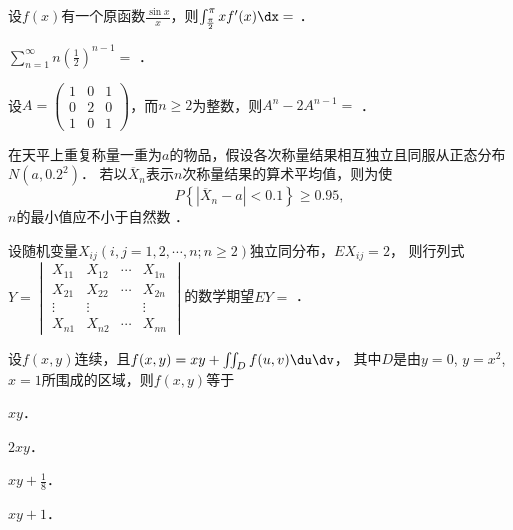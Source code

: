 \documentclass[plain,noanswer,medmath]{../../template/jnuexam}
\begin{document}






\begin{problem}
设$f(x)$有一个原函数$\frac{\sin x}{x}$，则$\int_{\frac{\pi}{2}}^{\pi}xf'(x)\dx =$ \fillin{}．
\end{problem}


\begin{problem}
$\sum_{n = 1}^{\infty}n\left(\frac{1}{2} \right)^{n - 1} =$ \fillin{}．
\end{problem}


\begin{problem}
设$A = \begin{pmatrix}
  1 & 0 & 1 \\
  0 & 2 & 0 \\
  1 & 0 & 1
\end{pmatrix}$，而$n \ge 2$为整数，则$A^n - 2A^{n - 1} =$ \fillin{}．
\end{problem}


\begin{problem}
在天平上重复称量一重为$a$的物品，假设各次称量结果相互独立且同服从正态分布$N(a, 0.2^2)$．
若以$\overline{X}_n$表示$n$次称量结果的算术平均值，则为使
$$P\left\{\left| \overline{X}_n - a \right| < 0.1 \right\} \ge 0.95,$$
$n$的最小值应不小于自然数 \fillin{}．
\end{problem}


\begin{problem}
设随机变量$X_{ij}\left(i,j = 1,2, \cdots ,n;n \ge 2 \right)$独立同分布，$EX_{ij} = 2$，
则行列式$Y = \begin{vmatrix}
  X_{11} & X_{12} & \cdots & X_{1n} \\
  X_{21} & X_{22} & \cdots & X_{2n} \\
  \vdots & \vdots &        & \vdots \\
  X_{n1} & X_{n2} & \cdots & X_{nn}
\end{vmatrix}$的数学期望$EY =$ \fillin{}．
\end{problem}






\begin{problem}
设$f(x,y)$连续，且$f(x,y) = xy + \iint_D f(u,v)\du\dv$，
其中$D$是由$y = 0$, $y = x^2$, $x = 1$所围成的区域，则$f(x,y)$等于\pickout{}
\begin{abcd}
\item $xy$．
\item $2xy$．
\item $xy + \frac{1}{8}$．
\item $xy + 1$．
\end{abcd}
\end{problem}
\end{document}

